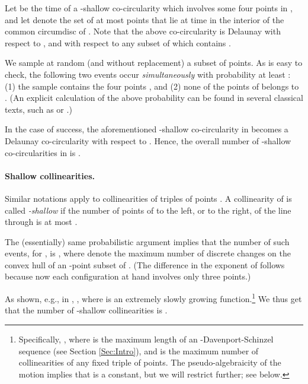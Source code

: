 \documentclass[letter,11pt]{article}
\begin{document}
Let  be the time of a -shallow co-circularity which involves some four points  in , and let  denote the set of at most  points that lie at time  in the interior of the common circumdisc of . Note that the above co-circularity is Delaunay with respect to , and with respect to any subset  of  which contains .

We sample at random (and without replacement) a subset  of  points. As is easy to check, the following two events occur {\it simultaneously} with probability at least : (1) the sample  contains the four points , and (2) none of the points of  belongs to . (An explicit calculation of the above probability can be found in several classical texts, such as \cite{CS} or \cite{SA95}.)

In the case of success, the aforementioned -shallow co-circularity in  becomes a Delaunay co-circularity with respect to . 
Hence, the overall number of -shallow co-circularities in  is .


\paragraph{Shallow collinearities.} Similar notations apply to collinearities of triples of points . A collinearity of  is called {\it -shallow} if the number of points of  to the left, or to the right, of the line through  is at most . 

The (essentially) same probabilistic argument implies that the number of such events, for , is , where  denote the maximum number of discrete changes on the convex hull of an -point subset of . (The difference in the exponent of  follows because now each configuration at hand involves only three points.)

As shown, e.g., in \cite[Section 8.6.1]{SA95},  , where  is an extremely slowly growing function.\footnote{Specifically,
, where  is the maximum length of an -Davenport-Schinzel sequence (see Section \ref{Sec:Intro}), and  is the maximum number of collinearities of any fixed triple of points. The pseudo-algebraicity of the motion implies that  is a constant, but we will restrict  further; see below.} We thus get that the number of -shallow collinearities is . 
\end{document}
